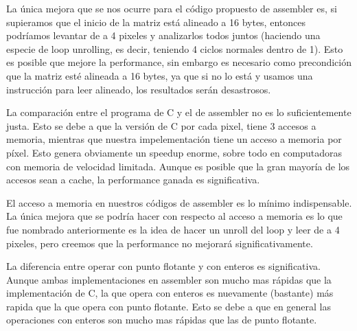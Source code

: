 La única mejora que se nos ocurre para el código propuesto de assembler es, si supieramos que el inicio de la matriz está alineado a 16 bytes, entonces podríamos levantar de a 4 pixeles y analizarlos todos juntos (haciendo una especie de loop unrolling, es decir, teniendo 4 ciclos normales dentro de 1).
Esto es posible que mejore la performance, sin embargo es necesario como precondición que la matriz esté alineada a 16 bytes, ya que si no lo está y usamos una instrucción para leer alineado, los resultados serán desastrosos.

La comparación entre el programa de C y el de assembler no es lo suficientemente justa. Esto se debe a que la versión de C por cada pixel, tiene 3 accesos a memoria, mientras que nuestra impelementación tiene un acceso a memoria por píxel. Esto genera obviamente un speedup enorme, sobre todo en computadoras con memoria de velocidad limitada.
Aunque es posible que la gran mayoría de los accesos sean a cache, la performance ganada es significativa.

El acceso a memoria en nuestros códigos de assembler es lo mínimo indispensable. La única mejora que se podría hacer con respecto al acceso a memoria es lo que fue nombrado anteriormente es la idea de hacer un unroll del loop y leer de a 4 pixeles, pero creemos que la performance no mejorará significativamente.

La diferencia entre operar con punto flotante y con enteros es significativa. Aunque ambas implementaciones en assembler son mucho mas rápidas que la implementación de C, la que opera con enteros es nuevamente (bastante) más rapida que la que opera con punto flotante. Esto se debe a que en general las operaciones con enteros son mucho mas rápidas que las de punto flotante.







